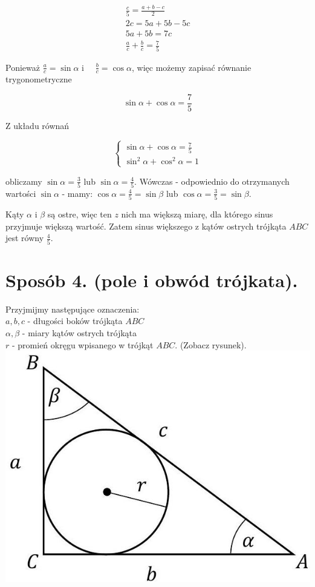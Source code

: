 \documentclass[10pt]{article}
\begin{document}
$$
\begin{gathered}
\frac{c}{5}=\frac{a+b-c}{2} \\
2 c=5 a+5 b-5 c \\
5 a+5 b=7 c \\
\frac{a}{c}+\frac{b}{c}=\frac{7}{5}
\end{gathered}
$$

Ponieważ $\frac{a}{c}=\sin \alpha$ i $\quad \frac{b}{c}=\cos \alpha$, więc możemy zapisać równanie trygonometryczne

$$
\sin \alpha+\cos \alpha=\frac{7}{5}
$$

Z układu równań

$$
\left\{\begin{array}{l}
\sin \alpha+\cos \alpha=\frac{7}{5} \\
\sin ^{2} \alpha+\cos ^{2} \alpha=1
\end{array}\right.
$$

obliczamy $\sin \alpha=\frac{3}{5}$ lub $\sin \alpha=\frac{4}{5}$. Wówczas - odpowiednio do otrzymanych wartości $\sin \alpha$ - mamy: $\cos \alpha=\frac{4}{5}=\sin \beta$ lub $\cos \alpha=\frac{3}{5}=\sin \beta$.

Kąty $\alpha$ i $\beta$ są ostre, więc ten $z$ nich ma większą miarę, dla którego sinus przyjmuje większą wartość. Zatem sinus większego z kątów ostrych trójkąta $A B C$ jest równy $\frac{4}{5}$.

\section*{Sposób 4. (pole i obwód trójkata).}
Przyjmijmy następujące oznaczenia:\\
$a, b, c$ - długości boków trójkąta $A B C$\\
$\alpha, \beta$ - miary kątów ostrych trójkąta\\
$r$ - promień okręgu wpisanego w trójkąt $A B C$. (Zobacz rysunek).\\
\includegraphics[max width=\textwidth, center]{2025_02_07_36131546116d12814c9cg-42}
\end{document}
